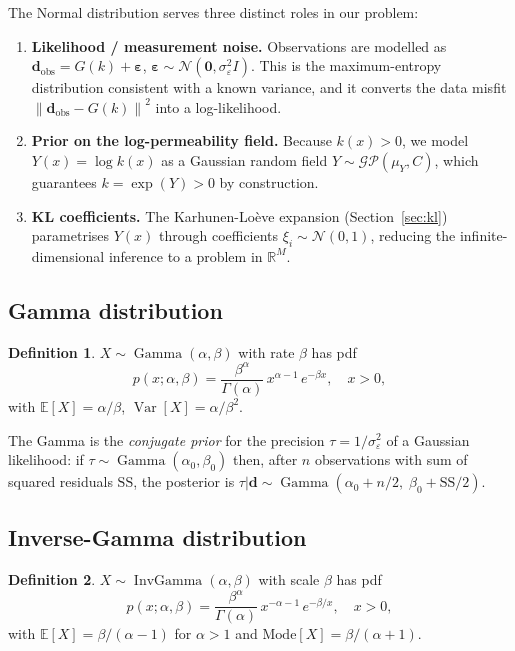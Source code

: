 \documentclass[11pt, a4paper]{article}
\newcommand{\R}{\mathbb{R}}
\newcommand{\N}{\mathcal{N}}
\newcommand{\E}{\mathbb{E}}
\newcommand{\Var}{\operatorname{Var}}
\newcommand{\IG}{\operatorname{InvGamma}}
\newcommand{\Ga}{\operatorname{Gamma}}
\newcommand{\GP}{\mathcal{GP}}
\newcommand{\norm}[1]{\left\|#1\right\|}
\theoremstyle{definition}
\newtheorem{definition}{Definition}[section]
\begin{document}
The Normal distribution serves three distinct roles in our problem:
\begin{enumerate}
  \item \textbf{Likelihood / measurement noise.}
    Observations are modelled as
    $\mathbf{d}_{\mathrm{obs}} = G(k) + \boldsymbol{\varepsilon}$,
    $\boldsymbol{\varepsilon}\sim\N(\mathbf{0},\sigma_\varepsilon^2 I)$.
    This is the maximum-entropy distribution consistent with a known
    variance, and it converts the data misfit $\norm{\mathbf{d}_{\mathrm{obs}}-G(k)}^2$
    into a log-likelihood.

  \item \textbf{Prior on the log-permeability field.}
    Because $k(x)>0$, we model $Y(x)=\log k(x)$ as a Gaussian random
    field $Y\sim\GP(\mu_Y, C)$, which guarantees $k=\exp(Y)>0$ by
    construction.

  \item \textbf{KL coefficients.}
    The Karhunen-Lo\`eve expansion (Section~\ref{sec:kl}) parametrises
    $Y(x)$ through coefficients $\xi_i\sim\N(0,1)$, reducing the
    infinite-dimensional inference to a problem in $\R^M$.
\end{enumerate}

\subsection{Gamma distribution}

\begin{definition}
  $X\sim\Ga(\alpha,\beta)$ with rate $\beta$ has pdf
  \[
    p(x;\alpha,\beta) = \frac{\beta^\alpha}{\Gamma(\alpha)}\,
    x^{\alpha-1}\,e^{-\beta x}, \quad x>0,
  \]
  with $\E[X]=\alpha/\beta$, $\Var[X]=\alpha/\beta^2$.
\end{definition}

The Gamma is the \emph{conjugate prior} for the precision
$\tau=1/\sigma_\varepsilon^2$ of a Gaussian likelihood: if
$\tau\sim\Ga(\alpha_0,\beta_0)$ then, after $n$ observations with
sum of squared residuals $\mathrm{SS}$, the posterior is
$\tau|\mathbf{d}\sim\Ga(\alpha_0+n/2,\;\beta_0+\mathrm{SS}/2)$.

\subsection{Inverse-Gamma distribution}

\begin{definition}
  $X\sim\IG(\alpha,\beta)$ with scale $\beta$ has pdf
  \[
    p(x;\alpha,\beta) = \frac{\beta^\alpha}{\Gamma(\alpha)}\,
    x^{-\alpha-1}\,e^{-\beta/x}, \quad x>0,
  \]
  with $\E[X]=\beta/(\alpha-1)$ for $\alpha>1$ and
  $\mathrm{Mode}[X]=\beta/(\alpha+1)$.
\end{definition}
\end{document}
